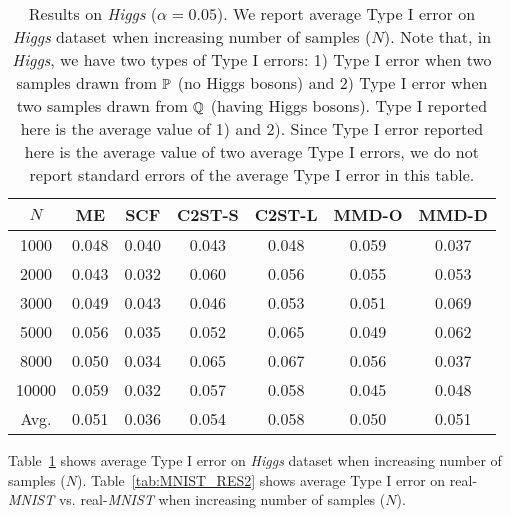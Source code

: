 \documentclass{article}
\begin{document}
\begin{table}[t]
\centering
  \small
  \caption{Results on \emph{Higgs} ($\alpha=0.05$). We report average Type I error on \emph{Higgs} dataset when increasing number of samples ($N$). Note that, in \emph{Higgs}, we have two types of Type I errors: 1) Type I error when two samples drawn from $\P$ (no Higgs bosons) and 2) Type I error when two samples drawn from $\Q$ (having Higgs bosons). Type I reported here is the average value of 1) and 2). Since Type I error reported here is the average value of two average Type I errors, we do not report standard errors of the average Type I error in this table.} \label{tab:Higgs_RES2}
\begin{tabular}{c|cccccc}
\toprule
$N$ & ME & SCF & C2ST-S & C2ST-L & MMD-O & MMD-D \\
\midrule
1000 & 0.048 & 0.040 & 0.043 & 0.048 & 0.059 & 0.037\\
2000 &  0.043 & 0.032 & 0.060 & 0.056 & 0.055 & 0.053 \\
3000 & 0.049 & 0.043 & 0.046 & 0.053 & 0.051 & 0.069 \\
5000 & 0.056 & 0.035 & 0.052 & 0.065 & 0.049 & 0.062 \\
8000 & 0.050 & 0.034 & 0.065 & 0.067 & 0.056 & 0.037  \\
10000 & 0.059 & 0.032 & 0.057 & 0.058 & 0.045 & 0.048 \\
\midrule
Avg. &  0.051 & 0.036 & 0.054 & 0.058 & 0.050 & 0.051  \\
\bottomrule
\end{tabular}

\end{table}

Table~\ref{tab:Higgs_RES2} shows average Type I error on \emph{Higgs} dataset when increasing number of samples ($N$). Table~\ref{tab:MNIST_RES2} shows  average Type I error on real-\emph{MNIST} vs. real-\emph{MNIST} when increasing number of samples ($N$).
\end{document}
